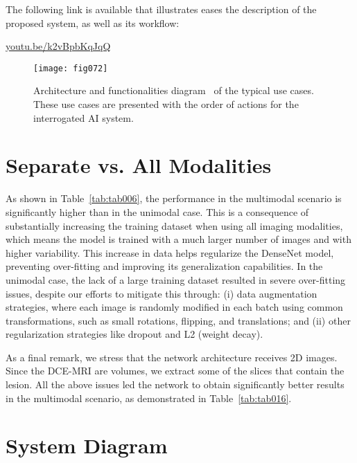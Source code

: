 \vspace{2mm}

\noindent
The following link is available that illustrates eases the description of the proposed system, as well as its workflow:

\vspace{2mm}

\noindent
\href{https://youtu.be/k2vBpbKqJqQ}{youtu.be/k2vBpbKqJqQ}


\begin{figure*}[htbp]
\centering
\captionsetup{justification=centering}
\texttt{[image: fig072]}
\caption{Architecture and functionalities diagram~\cite{nadia2020xai} of the typical use cases. These use cases are presented with the order of actions for the interrogated AI system.}
\label{fig:fig072}
\end{figure*}

\section{Separate vs. All Modalities}
\label{sec:app003006}

As shown in Table~\ref{tab:tab006}, the performance in the multimodal scenario is significantly higher than in the unimodal case.
This is a consequence of substantially increasing the training dataset when using all imaging modalities, which means the model is trained with a much larger number of images and with higher variability.
This increase in data helps regularize the DenseNet model, preventing over-fitting and improving its generalization capabilities.
In the unimodal case, the lack of a large training dataset resulted in severe over-fitting issues, despite our efforts to mitigate this through:
(i) data augmentation strategies, where each image is randomly modified in each batch using common transformations, such as small rotations, flipping, and translations; and
(ii) other regularization strategies like dropout and L2 (weight decay).

As a final remark, we stress that the network architecture receives 2D images.
Since the DCE-MRI are volumes, we extract some of the slices that contain the lesion.
All the above issues led the network to obtain significantly better results in the multimodal scenario, as demonstrated in Table~\ref{tab:tab016}.

\section{System Diagram}
\label{sec:app003007}

